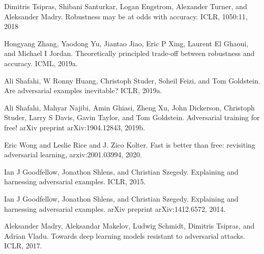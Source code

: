 \documentclass{article}
\begin{document}
\begin{thebibliography}{100} 
	 {Dimitris Tsipras, Shibani Santurkar, Logan Engstrom, Alexander Turner, and Aleksander Madry. Robustness may be at odds with accuracy. ICLR, 1050:11, 2018}

	 {Hongyang Zhang, Yaodong Yu, Jiantao Jiao, Eric P Xing, Laurent El Ghaoui, and Michael I Jordan. Theoretically principled trade-off between robustness and accuracy. ICML, 2019a.}
	
	 {Ali Shafahi, W Ronny Huang, Christoph Studer, Soheil Feizi, and Tom Goldstein. Are adversarial examples inevitable? ICLR, 2019a.}
	
	 {Ali Shafahi, Mahyar Najibi, Amin Ghiasi, Zheng Xu, John Dickerson, Christoph Studer, Larry S
		Davis, Gavin Taylor, and Tom Goldstein. Adversarial training for free!
		arXiv preprint
		arXiv:1904.12843, 2019b.}
	
	 {Eric Wong and Leslie Rice and J. Zico Kolter. Fast is better than free: revisiting adversarial learning, arxiv:2001.03994, 2020.}
	
	 {Ian J Goodfellow, Jonathon Shlens, and Christian Szegedy. Explaining and harnessing adversarial examples. ICLR, 2015.}
	
	 {Ian J Goodfellow, Jonathon Shlens, and Christian Szegedy. Explaining and harnessing adversarial examples. arXiv preprint arXiv:1412.6572, 2014.}
	
	 {Aleksander Madry, Aleksandar Makelov, Ludwig Schmidt, Dimitris Tsipras, and Adrian Vladu. Towards deep learning models resistant to adversarial attacks. ICLR, 2017.}
	
\end{thebibliography}
	
\end{document}
